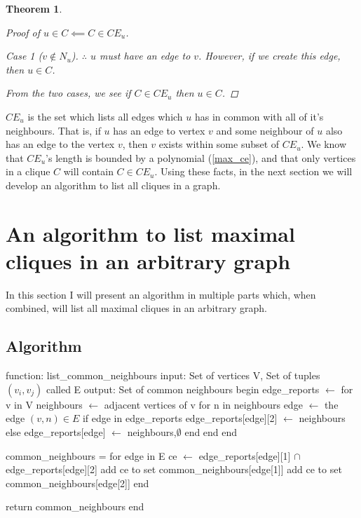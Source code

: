 \documentclass{article}
\theoremstyle{plain}
\newtheorem{thm}{Theorem}[section]
\theoremstyle{definition}
\theoremstyle{remark}
\newtheorem*{case}{Case}
\newcommand{\ce}[1]{ {{CE}_{#1}} }
\newcommand{\nev}[1]{ {N_{#1}} }
\begin{document}
\begin{thm}
\begin{proof}[Proof of \(u \in C \impliedby C \in \ce{u}\)]
\begin{case}[\(v \not\in \nev{u}\)]
            \(\therefore\) \(u\) must have an edge to \(v\). However, if we create this
            edge, then \(u \in C\).
        \end{case}
        From the two cases, we see if \(C \in \ce{u}\) then \(u \in C\).
    \end{proof}
    \label{c_in_ce}
\end{thm}

\(\ce{u}\) is the set which lists all edges which \(u\) has in common with all of it's
neighbours. That is, if \(u\) has an edge to vertex \(v\) and some neighbour of \(u\) also
has an edge to the vertex \(v\), then \(v\) exists within some subset of \(\ce{u}\). We
know that \(\ce{u}\)'s length is bounded by a polynomial (\ref{max_ce}), and that only
vertices in a clique \(C\) will contain \(C \in \ce{u}\). Using these facts, in the next
section we will develop an algorithm to list all cliques in a graph.

\section{An algorithm to list maximal cliques in an arbitrary graph}
In this section I will present an algorithm in multiple parts which, when combined, will
list all maximal cliques in an arbitrary graph.

\subsection{Algorithm}
\begin{algorithm}[caption={Create Common Neighbour Set}, label={algo_cn_construct}]
function: list_common_neighbours
    input: Set of vertices V, Set of tuples $(v_i, v_j)$ called E
    output: Set of common neighbours
    begin
        edge_reports $\gets$ {}
        for v in V
            neighbours $\gets$ adjacent vertices of v
            for n in neighbours
                edge $\gets$ the edge $(v, n) \in E$
                if edge in edge_reports
                    edge_reports[edge][2] $\gets$ neighbours
                else
                    edge_reports[edge] $\gets$ {neighbours,$\emptyset$}
                end
            end
        end

        common_neighbours = {}
        for edge in E
            ce $\gets$ edge_reports[edge][1] $\cap$ edge_reports[edge][2]
            add ce to set common_neighbours[edge[1]]
            add ce to set common_neighbours[edge[2]]
        end

        return common_neighbours
    end
\end{algorithm}
\end{document}
